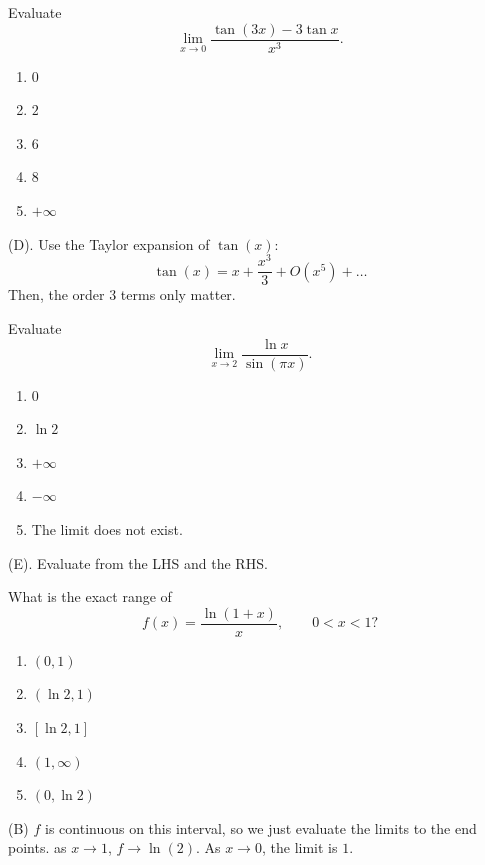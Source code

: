 \begin{exercise}
Evaluate
\[
\lim_{x\to0}
\frac{\tan(3x)-3\tan x}{x^3}.
\]
\begin{enumerate}[label=(\Alph*)]
    \item $0$
    \item $2$
    \item $6$
    \item $8$
    \item $+\infty$
\end{enumerate}
\end{exercise}
\begin{solution}
(D). Use the Taylor expansion of $\tan(x)$:
\[
\tan(x) = x + \frac{x^3}{3} + O(x^5) + \dots
\]
Then, the order $3$ terms only matter.
\end{solution}

\begin{exercise}
Evaluate
\[
\lim_{x\to2}
\frac{\ln x}{\sin(\pi x)}.
\]
\begin{enumerate}[label=(\Alph*)]
    \item $0$
    \item $\ln 2$
    \item $+\infty$
    \item $-\infty$
    \item The limit does not exist.
\end{enumerate}
\end{exercise}
\begin{solution}
(E). Evaluate from the LHS and the RHS.
\end{solution}

\begin{exercise}
What is the exact range of
\[
f(x)=\frac{\ln(1+x)}{x},
\qquad 0<x<1?
\]

\begin{enumerate}[label=(\Alph*)]
    \item $(0,1)$
    \item $(\ln2,1)$
    \item $[\ln2,1]$
    \item $(1,\infty)$
    \item $(0,\ln2)$
\end{enumerate}
\end{exercise}
\begin{solution}
(B) $f$ is continuous on this interval, so we just evaluate the limits to the end points.
as $x \rightarrow 1$, $f \rightarrow \ln(2)$. As $x \rightarrow 0$, the limit is $1$.
\end{solution}

